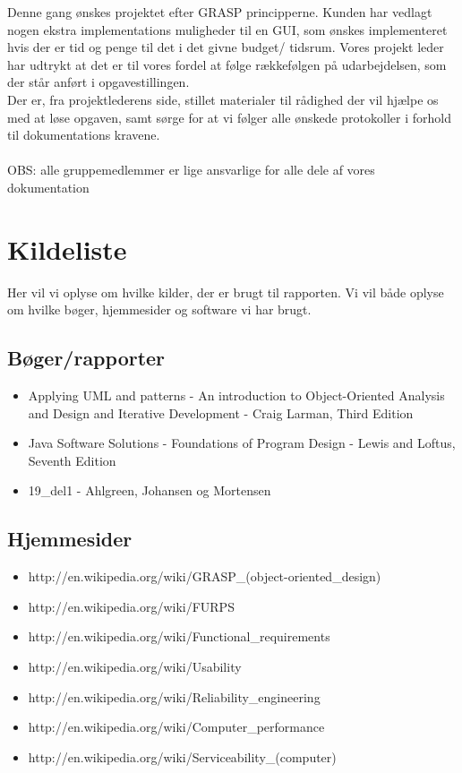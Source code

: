 \documentclass{article}
\begin{document}
Denne gang ønskes projektet efter GRASP principperne. 
Kunden har vedlagt nogen ekstra implementations muligheder til en GUI, som ønskes
implementeret hvis der er tid og penge til det i det givne budget/ tidsrum.
Vores projekt leder har udtrykt at det er til vores fordel at følge rækkefølgen
på udarbejdelsen, som der står anført i opgavestillingen.
\\
Der er, fra projektlederens side, stillet materialer til rådighed der vil
hjælpe os med at løse opgaven, samt sørge for at vi følger alle ønskede
protokoller i forhold til dokumentations kravene.
\\\\
OBS: alle gruppemedlemmer er lige ansvarlige for alle dele af vores dokumentation










\section{Kildeliste}
Her vil vi oplyse om hvilke kilder, der er brugt til rapporten.
Vi vil både oplyse om hvilke bøger, hjemmesider og software vi har brugt.
\printbibliography
\subsection{Bøger/rapporter}
\begin{itemize}
\item Applying UML and patterns - An introduction to Object-Oriented Analysis and Design and Iterative Development - Craig Larman, Third Edition
\item Java Software Solutions -  Foundations of Program Design - Lewis and Loftus, Seventh Edition
\item 19\_del1 - Ahlgreen, Johansen og Mortensen
\end{itemize}
\subsection{Hjemmesider}
\begin{itemize}
\item http://en.wikipedia.org/wiki/GRASP\_(object-oriented\_design)
\item http://en.wikipedia.org/wiki/FURPS
\item http://en.wikipedia.org/wiki/Functional_requirements
\item http://en.wikipedia.org/wiki/Usability
\item http://en.wikipedia.org/wiki/Reliability_engineering
\item http://en.wikipedia.org/wiki/Computer_performance
\item http://en.wikipedia.org/wiki/Serviceability_(computer)
\end{itemize}
\end{document}
